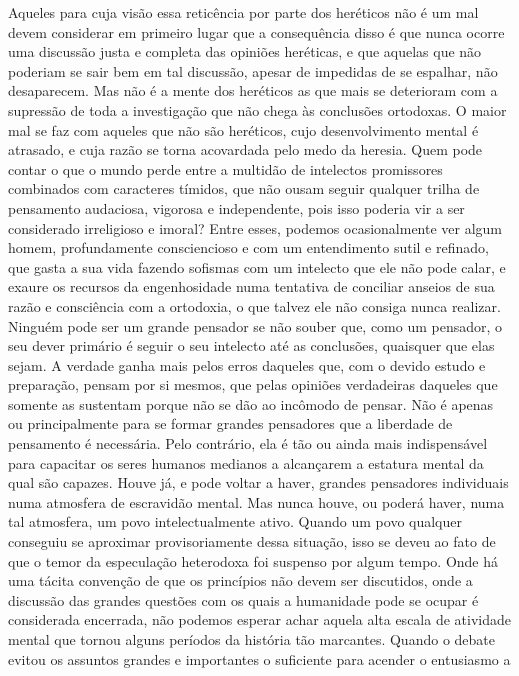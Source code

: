 Aqueles para cuja visão essa reticência por parte dos heréticos não é um
mal devem considerar em primeiro lugar que a consequência disso é que
nunca ocorre uma discussão justa e completa das opiniões heréticas, e
que aquelas que não poderiam se sair bem em tal discussão, apesar de
impedidas de se espalhar, não desaparecem. Mas não é a mente dos
heréticos as que mais se deterioram com a supressão de toda a
investigação que não chega às conclusões ortodoxas. O maior mal
se faz com aqueles que não são heréticos, cujo desenvolvimento mental é
atrasado, e cuja razão se torna acovardada pelo medo da heresia. Quem
pode contar o que o mundo perde entre a multidão de intelectos
promissores combinados com caracteres tímidos, que não ousam seguir
qualquer trilha de pensamento audaciosa, vigorosa e independente, pois
isso poderia vir a ser considerado irreligioso
e imoral? Entre esses, \mbox{podemos} ocasionalmente ver algum homem,
profundamente consciencioso e com um entendimento sutil e refinado, que
gasta a sua vida fazendo sofismas com um intelecto que ele não pode
calar, e exaure os recursos da engenhosidade numa tentativa de
conciliar anseios de sua razão e consciência com a ortodoxia, o que
talvez ele não consiga nunca realizar. Ninguém pode ser um grande
pensador se não souber que, como um pensador, o seu dever primário é
seguir o seu intelecto até as conclusões, quaisquer que elas sejam.
A verdade ganha mais pelos erros daqueles que, com o
devido estudo e preparação, pensam por si mesmos, que pelas opiniões
verdadeiras daqueles que somente as sustentam porque não se dão ao
incômodo de pensar. Não é apenas ou principalmente para se formar
grandes pensadores que a liberdade de pensamento é necessária. Pelo
contrário, ela é tão ou ainda mais indispensável para capacitar os
seres humanos medianos a alcançarem a estatura mental da qual são
capazes. Houve já, e pode voltar a haver, grandes pensadores
individuais numa atmosfera de escravidão mental. Mas nunca houve, ou
poderá haver, numa tal atmosfera, um povo intelectualmente ativo.
Quando um povo qualquer conseguiu se aproximar provisoriamente dessa
situação, isso se deveu ao fato de que o temor da especulação
heterodoxa foi suspenso por algum tempo. Onde há uma tácita convenção
de que os princípios não devem ser discutidos, onde a discussão das
grandes questões com os quais a humanidade pode se ocupar é
considerada encerrada, não podemos esperar achar aquela alta
escala de atividade mental que tornou alguns períodos da história tão
marcantes. Quando o debate evitou os assuntos grandes e
importantes o suficiente para acender o entusiasmo a
